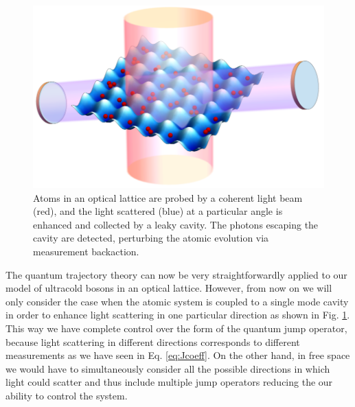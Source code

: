 \begin{figure}[htbp!]
  \centering
  \includegraphics[width=1.0\textwidth]{setup}
  \caption[Experimental Setup with Cavity]{Atoms in an optical lattice
    are probed by a coherent light beam (red), and the light scattered
    (blue) at a particular angle is enhanced and collected by a leaky
    cavity. The photons escaping the cavity are detected, perturbing
    the atomic evolution via measurement backaction.}
  \label{fig:cavity}
\end{figure}

The quantum trajectory theory can now be very straightforwardly
applied to our model of ultracold bosons in an optical
lattice. However, from now on we will only consider the case when the
atomic system is coupled to a single mode cavity in order to enhance
light scattering in one particular direction as shown in
Fig. \ref{fig:cavity}. This way we have complete control over the form
of the quantum jump operator, because light scattering in different
directions corresponds to different measurements as we have seen in
Eq. \eqref{eq:Jcoeff}. On the other hand, in free space we would have
to simultaneously consider all the possible directions in which light
could scatter and thus include multiple jump operators reducing the
our ability to control the system.

